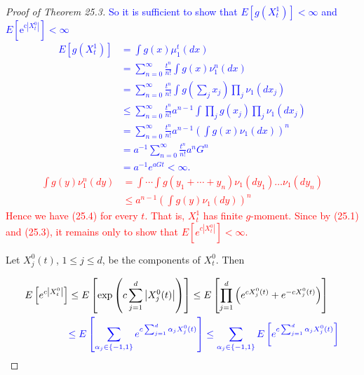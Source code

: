 \documentclass[a4paper,11pt]{article}
\begin{document}
\begin{proof}[Proof of Theorem 25.3]
    \textcolor{blue}{So it is sufficient to show that $E\left[g\left(X_{t}^{1}\right) \right]<\infty$ and
    $E\left[\mathrm{e}^{\mathrm{c}\left|X_{t}^{0}\right|}\right] < \infty$
    \begin{align*}
        E[g(X^{1}_{t})] & = \int g(x) \mu _{1} ^{t}(dx)                                                                                            \\
                        & =\sum_{n=0}^{\infty} \frac{t^{n}}{n !} \int g(x) \nu_{1}^{n}(dx)                                                         \\
                        & =\sum_{n=0}^{\infty} \frac{t^{n}}{n !} \int g\left(\sum_{j} x_{j}\right) \prod_{j}\nu_{1}\left(dx_{j}\right)             \\
                        & \le \sum_{n=0}^{\infty} \frac{t^{n}}{n !} a^{n-1}\int \prod_{j} g\left(x_{j}\right) \prod_{j} \nu_{1}\left(dx_{j}\right) \\
                        & =\sum_{n=0}^{\infty} \frac{t^{n}}{n !} a^{n-1} \left(\int g(x) \nu_{1}(dx)\right)^{n}                                    \\
                        & =a^{-1}\sum_{n=0}^{\infty} \frac{t^{n}}{n !} a^{n} G^{n}                                                                 \\
                        & = a^{-1} e^{aGt} < \infty.
    \end{align*}
    }
    \textcolor{red}{
    $$
        \begin{aligned}
            \int g(y) \nu_{1}^{n}(dy) & =\int \cdots \int g\left(y_{1}+\cdots+y_{n}\right) \nu_{1}\left(dy_{1}\right) \ldots \nu_{1}\left(d y_{n}\right) \\
                                      & \leq a^{n-1}\left(\int g(y) \nu_{1}(dy)\right)^{n}
        \end{aligned}
    $$
    Hence we have (25.4) for every $t$. That is, $X_{t}^{1}$ has finite $g$-moment.
    Since by (25.1) and (25.3), it remains only to show that $E\left[e^{c |X_{t}^{0}| }\right]<\infty$.
    }

    Let $X_{j}^{0}(t)$, $1 \leq j \leq d$, be the components of $X_{t}^{0}$. Then

    \begin{align*}
        E\left[e^{c\left|X_{t}^{0}\right|}\right] & \leq E\left[\exp \left(c \sum_{j=1}^{d}\left|X_{j}^{0}(t)\right|\right)\right] \leq E\left[\prod_{j=1}^{d}\left(e^{c X_{j}^{0}(t)}+e^{-c X_{j}^{0}(t)}\right)\right] \\
                                                  & \textcolor{blue}{
            \le  E \left[ \sum_{\alpha_{j} \in \{-1,1\}} e^{c \sum_{ j=1} ^{d} \alpha_{j} X^{0}_{j}(t)} \right]
            \le  \sum_{\alpha_{j} \in \{-1,1\}} E \left[e^{c \sum_{ j=1} ^{d} \alpha_{j} X^{0}_{j}(t)} \right]
        }
    \end{align*}


\end{proof}
\end{document}
